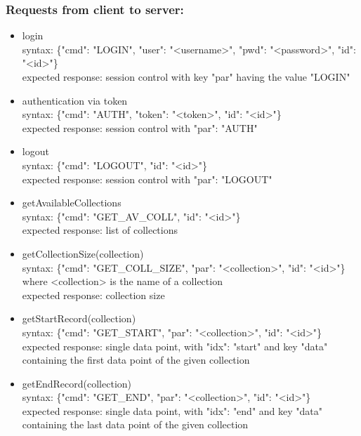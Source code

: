 \documentclass[oneside, english, final]{design}
\begin{document}
\subsubsection{Requests from client to server:}
\begin{itemize}
	\item{login}
	      \\
	      syntax: \{"cmd": "LOGIN", "user": "<username>", "pwd": "<password>", "id": "<id>"\} \\
	      expected response: session control with key "par" having the value "LOGIN"
		

	\item{authentication via token}
	      \\
	      syntax: \{"cmd": "AUTH", "token": "<token>", "id": "<id>"\} \\
	      expected response: session control with "par": "AUTH"

	\item{logout}
	      \\
	      syntax: \{"cmd": "LOGOUT", "id": "<id>"\} \\
	      expected response: session control with "par": "LOGOUT"

	\item{getAvailableCollections}
	      \\
	      syntax: \{"cmd": "GET\_AV\_COLL", "id": "<id>"\} \\
	      expected response: list of collections

	\item{getCollectionSize(collection)}
	      \\
	      syntax: \{"cmd": "GET\_COLL\_SIZE", "par": "<collection>", "id": "<id>"\} \\
	      where <collection> is the name of a collection\\
	      expected response: collection size

	\item{getStartRecord(collection)}
	      \\
	      syntax: \{"cmd": "GET\_START", "par": "<collection>", "id": "<id>"\} \\
	      expected response: single data point, with "idx": "start" and key "data" containing the first data point of the given collection

	\item{getEndRecord(collection)}
	      \\
	      syntax: \{"cmd": "GET\_END", "par": "<collection>", "id": "<id>"\} \\
	      expected response: single data point, with "idx": "end" and key "data" containing the last data point of the given collection


\end{itemize}
\end{document}

